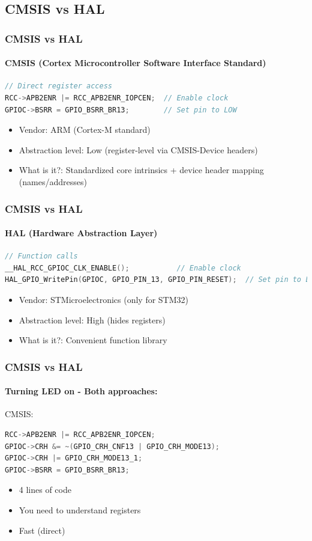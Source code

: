 \documentclass{beamer}
\begin{document}
\subsection{CMSIS vs HAL}
\begin{frame}[fragile]
	\frametitle{CMSIS vs HAL}
	\framesubtitle{CMSIS (Cortex Microcontroller Software Interface Standard)}
	\begin{lstlisting}[language=C]
// Direct register access
RCC->APB2ENR |= RCC_APB2ENR_IOPCEN;  // Enable clock
GPIOC->BSRR = GPIO_BSRR_BR13;        // Set pin to LOW
	\end{lstlisting}
	\begin{itemize}
		\item Vendor: ARM (Cortex-M standard)
		\item Abstraction level: Low (register-level via CMSIS-Device headers)
		\item What is it?: Standardized core intrinsics + device header mapping (names/addresses)
	\end{itemize}
\end{frame}
\begin{frame}[fragile]
	\frametitle{CMSIS vs HAL}
	\framesubtitle{HAL (Hardware Abstraction Layer)}
	\begin{lstlisting}[language=C]
// Function calls
__HAL_RCC_GPIOC_CLK_ENABLE();           // Enable clock
HAL_GPIO_WritePin(GPIOC, GPIO_PIN_13, GPIO_PIN_RESET);  // Set pin to LOW
	\end{lstlisting}
	\begin{itemize}
		\item Vendor: STMicroelectronics (only for STM32)
		\item Abstraction level: High (hides registers)
		\item What is it?: Convenient function library
	\end{itemize}
\end{frame}
\begin{frame}[fragile]
	\frametitle{CMSIS vs HAL}
	\framesubtitle{Turning LED on - Both approaches:}
	CMSIS:
	\begin{lstlisting}[language=C]
RCC->APB2ENR |= RCC_APB2ENR_IOPCEN;
GPIOC->CRH &= ~(GPIO_CRH_CNF13 | GPIO_CRH_MODE13);
GPIOC->CRH |= GPIO_CRH_MODE13_1;
GPIOC->BSRR = GPIO_BSRR_BR13;
	\end{lstlisting}
	\begin{itemize}
		\item 4 lines of code
		\item You need to understand registers
		\item Fast (direct)
	\end{itemize}
\end{frame}
\end{document}
